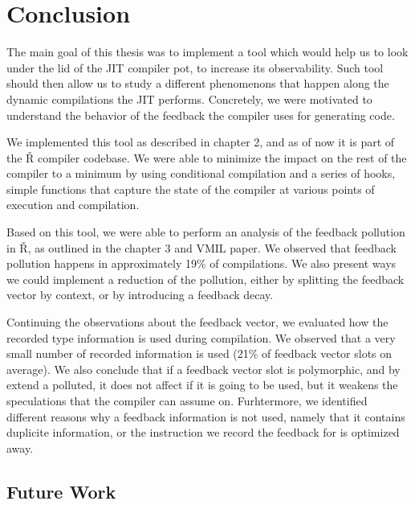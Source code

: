\chapter*{Conclusion}

The main goal of this thesis was to implement a tool which would help us to look under the lid of the JIT compiler pot, to increase its observability. Such tool should then allow us to study a different phenomenons that happen along the dynamic compilations the JIT performs. Concretely, we were motivated to understand the behavior of the feedback the compiler uses for generating code.

We implemented this tool as described in chapter 2, and as of now it is part of the Ř compiler codebase. We were able to minimize the impact on the rest of the compiler to a minimum by using conditional compilation and a series of hooks, simple functions that capture the state of the compiler at various points of execution and compilation.

Based on this tool, we were able to perform an analysis of the feedback pollution in Ř, as outlined in the chapter 3 and VMIL paper\cite{feedback-vmil}. We observed that feedback pollution happens in approximately 19\% of compilations. We also present ways we could implement a reduction of the pollution, either by splitting the feedback vector by context, or by introducing a feedback decay.

Continuing the observations about the feedback vector, we evaluated how the recorded type information is used during compilation. We observed that a very small number of recorded information is used (21\% of feedback vector slots on average). We also conclude that if a feedback vector slot is polymorphic, and by extend a polluted, it does not affect if it is going to be used, but it weakens the speculations that the compiler can assume on. Furhtermore, we identified different reasons why a feedback information is not used, namely that it contains duplicite information, or the instruction we record the feedback for is optimized away.

\section*{Future Work}

